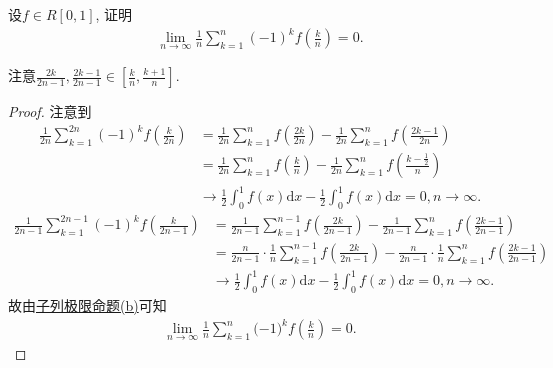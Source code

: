 \documentclass[../../main.tex]{subfiles}
\begin{document}
\begin{example}
设$f \in R[0,1]$, 证明
\begin{align*}
\lim_{n \to \infty} \frac{1}{n} \sum_{k=1}^{n} (-1)^k f\left( \frac{k}{n} \right) = 0.
\end{align*}
\end{example}
\begin{note}
注意$\frac{2k}{2n-1},\frac{2k-1}{2n-1}\in \left[ \frac{k}{n},\frac{k+1}{n} \right]$.
\end{note}
\begin{proof}
注意到
\begin{align*}
\frac{1}{2n}\sum_{k=1}^{2n}{\left( -1 \right) ^kf\left( \frac{k}{2n} \right)}&=\frac{1}{2n}\sum_{k=1}^n{f\left( \frac{2k}{2n} \right)}-\frac{1}{2n}\sum_{k=1}^n{f\left( \frac{2k-1}{2n} \right)}\\
&=\frac{1}{2n}\sum_{k=1}^n{f\left( \frac{k}{n} \right)}-\frac{1}{2n}\sum_{k=1}^n{f\left( \frac{k-\frac{1}{2}}{n} \right)}\\
&\rightarrow \frac{1}{2}\int_0^1{f\left( x \right) \mathrm{d}x}-\frac{1}{2}\int_0^1{f\left( x \right) \mathrm{d}x}=0,n\rightarrow \infty .
\end{align*}
\begin{align*}
\frac{1}{2n-1}\sum_{k=1}^{2n-1}{\left( -1 \right) ^kf\left( \frac{k}{2n-1} \right)}&=\frac{1}{2n-1}\sum_{k=1}^{n-1}{f\left( \frac{2k}{2n-1} \right)}-\frac{1}{2n-1}\sum_{k=1}^n{f\left( \frac{2k-1}{2n-1} \right)}\\
&=\frac{n}{2n-1}\cdot \frac{1}{n}\sum_{k=1}^{n-1}{f\left( \frac{2k}{2n-1} \right)}-\frac{n}{2n-1}\cdot \frac{1}{n}\sum_{k=1}^n{f\left( \frac{2k-1}{2n-1} \right)}\\
&\rightarrow \frac{1}{2}\int_0^1{f\left( x \right) \mathrm{d}x}-\frac{1}{2}\int_0^1{f\left( x \right) \mathrm{d}x}=0,n\rightarrow \infty .
\end{align*}
故由\hyperref[proposition:子列极限命题]{子列极限命题(b)}可知
\begin{align*}
\lim_{n\rightarrow \infty} \frac{1}{n}\sum_{k=1}^n{(}-1)^kf\left( \frac{k}{n} \right) =0.
\end{align*}

\end{proof}
\end{document}
